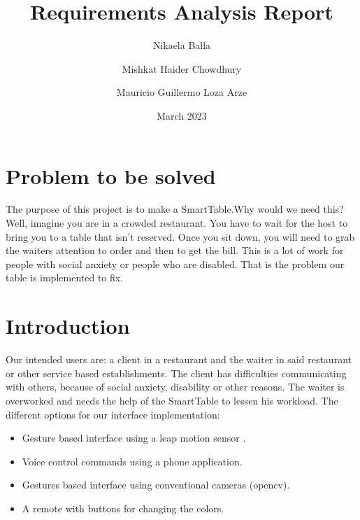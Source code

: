 \documentclass{article}
\title{Requirements Analysis Report}
\author{Nikaela Balla
\and Mishkat Haider Chowdhury
\and Mauricio Guillermo Loza Arze}
\date{March 2023}
\begin{document}
\maketitle

\section{ Problem to be solved}
\label{sec:problem}
The purpose of this project is to make a SmartTable.Why would we need this? 
Well, imagine you are in a crowded restaurant. You have to wait for the host to bring you to a table that isn't reserved. Once you sit down,
you will need to grab the waiters attention to order and then to get the bill. This is a lot of work for people with social anxiety or people 
who are disabled. That is the problem our table is implemented to fix. 
\section{ Introduction}
Our intended users are: a client in a restaurant and the waiter in said restaurant or other service based establishments.
The client has difficulties communicating with others, because of social anxiety, disability or other reasons. The waiter is overworked and
needs the help of the SmartTable to lessen his workload.
The different options for our interface implementation: \begin{itemize}
    \item Gesture based interface using a leap motion sensor \cite{zaicti2015free}.
    \item  Voice control commands using a phone application.
    \item  Gestures based interface using conventional cameras (opencv).
    \item A remote with buttons for changing the colors.
\end{itemize}
\end{document}

